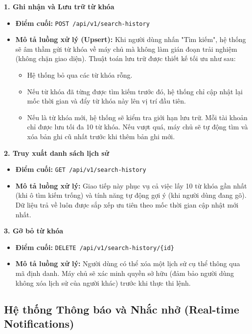 \noindent\textbf{1. Ghi nhận và Lưu trữ từ khóa}
\begin{itemize}
    \item \textbf{Điểm cuối:} \texttt{POST /api/v1/search-history} 
    \item \textbf{Mô tả luồng xử lý (Upsert):} Khi người dùng nhấn "Tìm kiếm", hệ thống sẽ âm thầm gửi từ khóa về máy chủ mà không làm gián đoạn trải nghiệm (không chặn giao diện). Thuật toán lưu trữ được thiết kế tối ưu như sau:
    \begin{itemize}
        \item Hệ thống bỏ qua các từ khóa rỗng.
        \item Nếu từ khóa đã từng được tìm kiếm trước đó, hệ thống chỉ cập nhật lại mốc thời gian và đẩy từ khóa này lên vị trí đầu tiên.
        \item Nếu là từ khóa mới, hệ thống sẽ kiểm tra giới hạn lưu trữ. Mỗi tài khoản chỉ được lưu tối đa 10 từ khóa. Nếu vượt quá, máy chủ sẽ tự động tìm và xóa bản ghi cũ nhất trước khi thêm bản ghi mới.
    \end{itemize}
\end{itemize}

\noindent\textbf{2. Truy xuất danh sách lịch sử}
\begin{itemize}
    \item \textbf{Điểm cuối:} \texttt{GET /api/v1/search-history}    \item \textbf{Mô tả luồng xử lý:} Giao tiếp này phục vụ cả việc lấy 10 từ khóa gần nhất (khi ô tìm kiếm trống) và tính năng tự động gợi ý (khi người dùng đang gõ). Dữ liệu trả về luôn được sắp xếp ưu tiên theo mốc thời gian cập nhật mới nhất.
\end{itemize}

\noindent\textbf{3. Gỡ bỏ từ khóa}
\begin{itemize}
    \item \textbf{Điểm cuối:} \texttt{DELETE /api/v1/search-history/\{id\}}     \item \textbf{Mô tả luồng xử lý:} Người dùng có thể xóa một lịch sử cụ thể thông qua mã định danh. Máy chủ sẽ xác minh quyền sở hữu (đảm bảo người dùng không xóa lịch sử của người khác) trước khi thực thi lệnh.
\end{itemize}


\subsection{Hệ thống Thông báo và Nhắc nhở (Real-time Notifications)}

